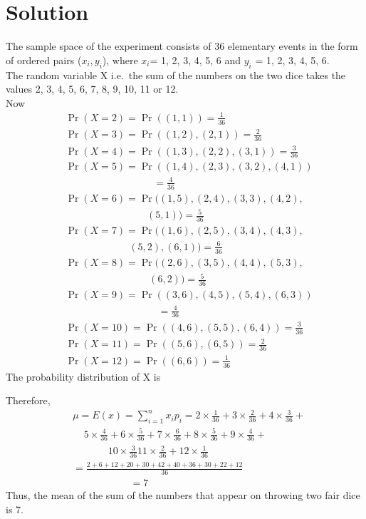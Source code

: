 \documentclass[journal,12pt,twocolumn]{IEEEtran}
\begin{document}
\section{Solution} 
\solution{}
The sample space of the experiment consists of 36 elementary events in the
form of ordered pairs ($x_i, y_i$), where $x_i $= 1, 2, 3, 4, 5, 6 and $y_i$ = 1, 2, 3, 4, 5, 6.\\
The random variable X i.e.\ the sum of the numbers on the two dice takes the
values 2, 3, 4, 5, 6, 7, 8, 9, 10, 11 or 12.\\
Now
\begin{align}
&\Pr(X = 2) = \Pr({(1,1)}) = \frac{1}{36}\\
&\Pr(X = 3) = \Pr({(1,2), (2,1)}) = \frac{2}{36}\\ 
&\Pr(X = 4) = \Pr({(1,3), (2,2), (3,1)}) = \frac{3}{36}\\
&\Pr(X = 5) = \Pr({(1,4), (2,3), (3,2), (4,1)}) \nonumber\\ 
&~~~~~~~~~~~~~~~~~~~~~~~~~~~~~~~~~~~~~~~~= \frac{4}{36}\\
&\Pr(X = 6) = \Pr((1,5), (2,4), (3,3), (4,2), \nonumber\\
& ~~~~~~~~~~~~~~~~~~~~~~~~~~~~~~~~~~~~~(5,1)) = \frac{5}{36}\\
&\Pr(X = 7) = \Pr((1,6), (2,5), (3,4), (4,3),\nonumber\\
&~~~~~~~~~~~~~~~~~~~~~~~~~~~~~(5,2), (6,1)) = \frac{6}{36}
\end{align}
\begin{align}   
&\Pr(X = 8) = \Pr((2,6), (3,5), (4,4), (5,3),\nonumber\\ 
&~~~~~~~~~~~~~~~~~~~~~~~~~~~~~~~~~~~~~~(6,2)) = \frac{5}{36}\\   
&\Pr(X = 9) = \Pr({(3,6), (4,5), (5,4), (6,3)}) \nonumber\\
&~~~~~~~~~~~~~~~~~~~~~~~~~~~~~~~~~~~~~~~~~~= \frac{4}{36}\\ 
&\Pr(X = 10) = \Pr({(4,6), (5,5), (6,4)}) = \frac{3}{36}\\
&\Pr(X = 11) = \Pr({(5,6), (6,5)}) = \frac{2}{36}\\  
&\Pr(X = 12) = \Pr({(6,6)}) = \frac{1}{36} 
\end{align}    
The probability distribution of X is  
\begin{table}[h]  
    \addtolength{\tabcolsep}{-5pt}\small
    \label{Table 1}	
\end{table} 
Therefore,\\
\begin{align}
    &\mu = E(x) = \sum_{i=1}^{n}{x_i}{p_i}  = 2\times\frac{1}{36}+3\times\frac{2}{36}+4\times\frac{3}{36}+\nonumber\\
    &~~~~~5\times\frac{4}{36}+6\times\frac{5}{36}+7\times\frac{6}{36}+8\times\frac{5}{36}+9\times\frac{4}{36}+\nonumber\\
    &~~~~~~~~~~~~~~~~10\times\frac{3}{36}11\times\frac{2}{36}+12\times\frac{1}{36}\\
    &=\frac{2+6+12+20+30+42+40+36+30+22+12}{36}\\
    &~~~~~~~~~~~~~~~~~~~~~~~~~~= 7
\end{align}
Thus, the mean of the sum of the numbers that appear on throwing two fair dice is 7.
\end{document}
